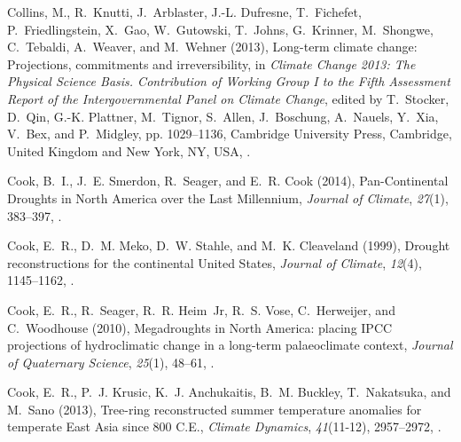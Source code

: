\documentclass[draft,jgr]{AGUTeX}
\begin{document}
\begin{article}
\begin{thebibliography}{74}
Collins, M., R.~Knutti, J.~Arblaster, J.-L. Dufresne, T.~Fichefet,
  P.~Friedlingstein, X.~Gao, W.~Gutowski, T.~Johns, G.~Krinner, M.~Shongwe,
  C.~Tebaldi, A.~Weaver, and M.~Wehner (2013), Long-term climate change:
  Projections, commitments and irreversibility, in \textit{Climate Change 2013:
  The Physical Science Basis. Contribution of Working Group I to the Fifth
  Assessment Report of the Intergovernmental Panel on Climate Change}, edited
  by T.~Stocker, D.~Qin, G.-K. Plattner, M.~Tignor, S.~Allen, J.~Boschung,
  A.~Nauels, Y.~Xia, V.~Bex, and P.~Midgley, pp. 1029--1136, Cambridge
  University Press, Cambridge, United Kingdom and New York, NY, USA,
  .

Cook, B.~I., J.~E. Smerdon, R.~Seager, and E.~R. Cook (2014), {Pan-Continental
  Droughts in North America over the Last Millennium}, \textit{Journal of
  Climate}, \textit{27}(1), 383--397, .

Cook, E.~R., D.~M. Meko, D.~W. Stahle, and M.~K. Cleaveland (1999), {Drought
  reconstructions for the continental United States}, \textit{Journal of
  Climate}, \textit{12}(4), 1145--1162,
  .

Cook, E.~R., R.~Seager, R.~R. Heim~Jr, R.~S. Vose, C.~Herweijer, and
  C.~Woodhouse (2010), {Megadroughts in North America: placing IPCC projections
  of hydroclimatic change in a long-term palaeoclimate context},
  \textit{Journal of Quaternary Science}, \textit{25}(1), 48--61,
  .

Cook, E.~R., P.~J. Krusic, K.~J. Anchukaitis, B.~M. Buckley, T.~Nakatsuka, and
  M.~Sano (2013), {Tree-ring reconstructed summer temperature anomalies for
  temperate East Asia since 800 C.E.}, \textit{Climate Dynamics},
  \textit{41}(11-12), 2957--2972, .


\end{thebibliography}
\end{article}
\end{document}
